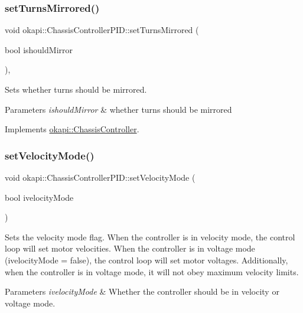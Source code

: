 \subsubsection{\texorpdfstring{setTurnsMirrored()}{setTurnsMirrored()}}
{\footnotesize\ttfamily void okapi\+::\+Chassis\+Controller\+P\+I\+D\+::set\+Turns\+Mirrored (\begin{DoxyParamCaption}\item[{bool}]{ishould\+Mirror }\end{DoxyParamCaption})\hspace{0.3cm}{\ttfamily [override]}, {\ttfamily [virtual]}}

Sets whether turns should be mirrored.


\begin{DoxyParams}{Parameters}
{\em ishould\+Mirror} & whether turns should be mirrored \\
\hline
\end{DoxyParams}


Implements \mbox{\hyperlink{classokapi_1_1ChassisController_a37ae36ec8936272eb31e3baed7eed417}{okapi\+::\+Chassis\+Controller}}.

\mbox{\label{classokapi_1_1ChassisControllerPID_a2325280ebca6ddc45fe6bc197b0dcb00}} 
\subsubsection{\texorpdfstring{setVelocityMode()}{setVelocityMode()}}
{\footnotesize\ttfamily void okapi\+::\+Chassis\+Controller\+P\+I\+D\+::set\+Velocity\+Mode (\begin{DoxyParamCaption}\item[{bool}]{ivelocity\+Mode }\end{DoxyParamCaption})}

Sets the velocity mode flag. When the controller is in velocity mode, the control loop will set motor velocities. When the controller is in voltage mode ({\ttfamily ivelocity\+Mode = false}), the control loop will set motor voltages. Additionally, when the controller is in voltage mode, it will not obey maximum velocity limits.


\begin{DoxyParams}{Parameters}
{\em ivelocity\+Mode} & Whether the controller should be in velocity or voltage mode. \\
\hline
\end{DoxyParams}
\mbox{\label{classokapi_1_1ChassisControllerPID_aaf7664abcf588a985bb8755df62eacd9}} 
